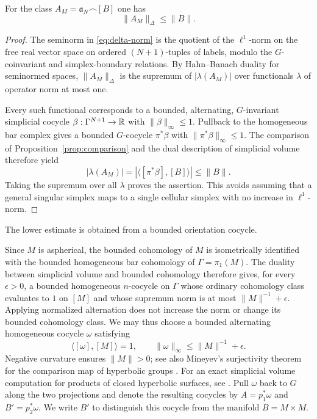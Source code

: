 \begin{lemma}\label{lem:upper-norm}
For the class
$A_M=\mathfrak a_N\frown[B]$ one has
\[
 \|A_M\|_\Delta\leq\|B\|.
\]
\end{lemma}

\begin{proof}
The seminorm in \eqref{eq:delta-norm} is the quotient
of the $\ell^1$-norm on the free real vector space
on ordered $(N+1)$-tuples of labels, modulo the
$G$-coinvariant and simplex-boundary relations.
By Hahn--Banach duality for seminormed spaces,
$\|A_M\|_\Delta$ is the supremum of
$|\lambda(A_M)|$ over functionals $\lambda$
of operator norm at most one.

Every such functional corresponds to a bounded,
alternating, $G$-invariant simplicial cocycle
$\beta:\Gamma^{N+1}\to\mathbb{R}$ with
$\|\beta\|_\infty\leq1$.
Pullback to the homogeneous bar complex gives a
bounded $G$-cocycle $\pi^*\beta$ with
$\|\pi^*\beta\|_\infty\leq1$.
The comparison of Proposition~\ref{prop:comparison}
and the dual description of simplicial volume
therefore yield
\[
 |\lambda(A_M)|
 =|\langle[\pi^*\beta],[B]\rangle|
 \leq\|B\|.
\]
Taking the supremum over all $\lambda$ proves
the assertion. This avoids assuming that a
general singular simplex maps to a single
cellular simplex with no increase in $\ell^1$-norm.
\end{proof}

The lower estimate is obtained from a bounded orientation cocycle.

Since $M$ is aspherical, the bounded cohomology
of $M$ is isometrically identified with the
bounded homogeneous bar cohomology of
$\Gamma=\pi_1(M)$. The duality between
simplicial volume and bounded cohomology
\cite{Gromov1982} therefore gives, for every
$\epsilon>0$, a bounded homogeneous
$n$-cocycle on $\Gamma$ whose ordinary
cohomology class evaluates to $1$ on $[M]$
and whose supremum norm is at most
$\|M\|^{-1}+\epsilon$.
Applying normalized alternation does not
increase the norm or change its bounded
cohomology class. We may thus choose a
bounded alternating homogeneous cocycle
$\omega$ satisfying
\begin{equation}\label{eq:orientation-norm}
 \langle[\omega],[M]\rangle=1,\qquad
 \|\omega\|_\infty\leq\|M\|^{-1}+\epsilon.
\end{equation}
Negative curvature ensures $\|M\|>0$; see also Mineyev's
surjectivity theorem for the comparison map of hyperbolic groups
\cite{Mineyev2001}. For an exact simplicial volume computation
for products of closed hyperbolic surfaces, see
\cite{BucherKarlsson2008}.
Pull $\omega$ back to $G$ along the two
projections and denote the resulting cocycles by
$A=p_1^*\omega$ and $B'=p_2^*\omega$.
We write $B'$ to distinguish this cocycle
from the manifold $B=M\times M$.


